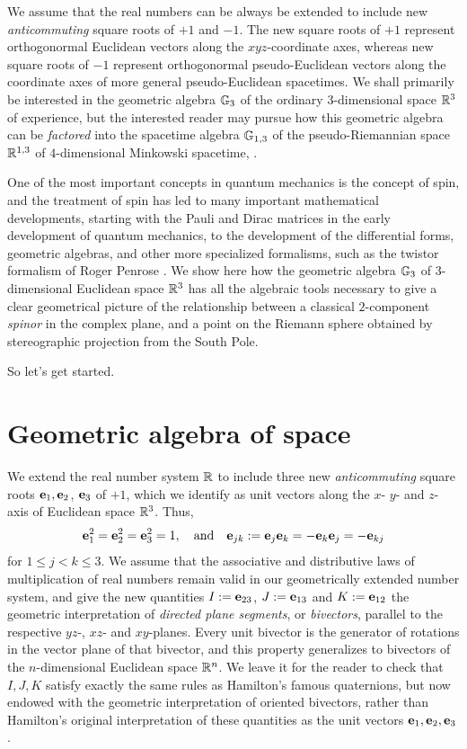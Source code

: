 \documentclass[]{article}
\begin{document}
We assume that the real numbers can be always be extended to include new {\it anticommuting} square roots of
$+1$ and $-1$. The new square roots of $+1$ represent orthogonormal Euclidean vectors along the
$xyz$-coordinate axes, whereas new square roots of $-1$ represent orthogonormal pseudo-Euclidean vectors
along the coordinate axes of more general pseudo-Euclidean spacetimes. We shall primarily be
interested in the geometric algebra $\mathbb{G}_3$ of the ordinary $3$-dimensional space $\mathbb{R}^3$ of experience,
but the interested reader may pursue how this geometric algebra can be {\it factored} into the spacetime
algebra $\mathbb{G}_{1,3}$ of the pseudo-Riemannian space $\mathbb{R}^{1,3}$ of $4$-dimensional Minkowski spacetime, \cite[Ch.11]{SNF}. 

One of the most important concepts in quantum mechanics is the concept of spin, and the
treatment of spin has led to many important mathematical developments, starting with the
Pauli and Dirac matrices in the early development of quantum mechanics, to the development of the
differential forms, geometric algebras, and other more specialized formalisms, such as the twistor formalism 
of Roger Penrose \cite[Ch.33]{Pen04}. We show here how the geometric algebra $\mathbb{G}_3$ of $3$-dimensional Euclidean space $\mathbb{R}^3$
 has all the algebraic tools
necessary to give a clear geometrical picture of the relationship between a classical $2$-component {\it spinor}
in the complex plane, and a point on the Riemann sphere obtained by stereographic projection
from the South Pole.

So let's get started.

\section{Geometric algebra of space}

We extend the real number system $\mathbb{R}$ to include three new {\it anticommuting} square roots $\mathbf{e}_1, \mathbf{e}_2$, $\mathbf{e}_3$ of $+1$,
which we identify as unit vectors along the $x$- $y$- and $z$-axis of Euclidean space $\mathbb{R}^3$. Thus,
\[  \mathbf{e}_1^2=\mathbf{e}_2^2=\mathbf{e}_3^2=1, \quad {\rm and} \quad \mathbf{e}_{jk}:=\mathbf{e}_j\mathbf{e}_k=-\mathbf{e}_k \mathbf{e}_j=- \mathbf{e}_{kj}\]
for $1 \le j < k \le 3$.
We assume that the associative and distributive laws of multiplication of real numbers remain valid
in our geometrically extended number system, and give the new quantities $I:= \mathbf{e}_{23}$, $J:= \mathbf{e}_{13}$
and $K:=\mathbf{e}_{12}$ the geometric interpretation of {\it directed plane segments}, or {\it bivectors}, parallel
to the respective $yz$-, $xz$- and $xy$-planes. 
Every unit bivector 
is the generator of rotations in the vector plane of that
bivector, and this property generalizes to bivectors of the $n$-dimensional Euclidean space $\mathbb{R}^n$.  
We leave it for the reader to check that $I,J,K$ satisfy
exactly the same rules as Hamilton's famous quaternions, but now endowed with the geometric interpretation
of oriented bivectors, rather than Hamilton's original interpretation of these quantities as the unit vectors
$\mathbf{e}_1, \mathbf{e}_2, \mathbf{e}_3$.
\end{document}
